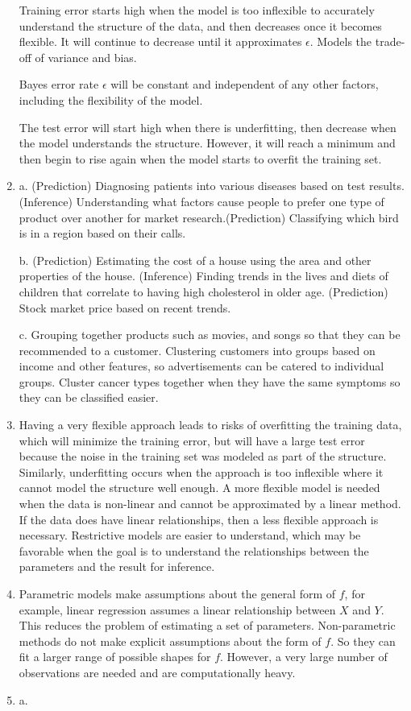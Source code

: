 \documentclass[
]{article}
\begin{document}
\begin{enumerate}
  Training error starts high when the model is too inflexible to
  accurately understand the structure of the data, and then decreases
  once it becomes flexible. It will continue to decrease until it
  approximates \(\epsilon\). Models the trade-off of variance and bias.

  Bayes error rate \(\epsilon\) will be constant and independent of any
  other factors, including the flexibility of the model.

  The test error will start high when there is underfitting, then
  decrease when the model understands the structure. However, it will
  reach a minimum and then begin to rise again when the model starts to
  overfit the training set.
\item
  a. (Prediction) Diagnosing patients into various diseases based on
  test results.(Inference) Understanding what factors cause people to
  prefer one type of product over another for market
  research.(Prediction) Classifying which bird is in a region based on
  their calls.

  b. (Prediction) Estimating the cost of a house using the area and
  other properties of the house. (Inference) Finding trends in the lives
  and diets of children that correlate to having high cholesterol in
  older age. (Prediction) Stock market price based on recent trends.

  c. Grouping together products such as movies, and songs so that they
  can be recommended to a customer. Clustering customers into groups
  based on income and other features, so advertisements can be catered
  to individual groups. Cluster cancer types together when they have the
  same symptoms so they can be classified easier.
\item
  Having a very flexible approach leads to risks of overfitting the
  training data, which will minimize the training error, but will have a
  large test error because the noise in the training set was modeled as
  part of the structure. Similarly, underfitting occurs when the
  approach is too inflexible where it cannot model the structure well
  enough. A more flexible model is needed when the data is non-linear
  and cannot be approximated by a linear method. If the data does have
  linear relationships, then a less flexible approach is necessary.
  Restrictive models are easier to understand, which may be favorable
  when the goal is to understand the relationships between the
  parameters and the result for inference.
\item
  Parametric models make assumptions about the general form of \(f\),
  for example, linear regression assumes a linear relationship between
  \(X\) and \(Y\). This reduces the problem of estimating a set of
  parameters. Non-parametric methods do not make explicit assumptions
  about the form of \(f\). So they can fit a larger range of possible
  shapes for \(f\). However, a very large number of observations are
  needed and are computationally heavy.
\item
  a.


\end{enumerate}
\end{document}
